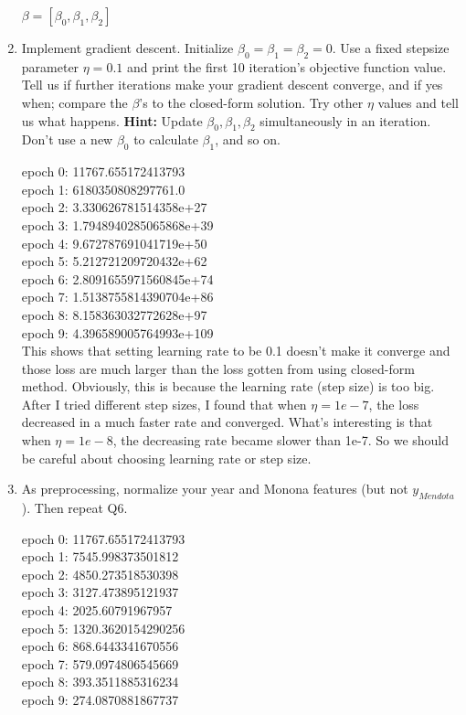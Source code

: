 \documentclass[a4paper]{article}
\theoremstyle{definition}
\newenvironment{soln}{
    \leavevmode\color{blue}\ignorespaces
}{}
\begin{document}
\begin{enumerate}
\begin{soln}
$\beta = [\beta_0, \beta_1, \beta_2]$
\end{soln}

\item
Implement gradient descent.  Initialize $\beta_0= \beta_1= \beta_2=0$.  Use a fixed stepsize parameter $\eta=0.1$ and print the first 10 iteration's objective function value.
Tell us if further iterations make your gradient descent converge, and if yes when; compare the $\beta$'s to the closed-form solution.
Try other $\eta$ values and tell us what happens.
\textbf{Hint:} Update $\beta_0, \beta_1, \beta_2$ simultaneously in an iteration.  Don't use a new $\beta_0$ to calculate $\beta_1$, and so on.

\begin{soln}
epoch 0:  11767.655172413793\\
epoch 1:  6180350808297761.0\\
epoch 2:  3.330626781514358e+27\\
epoch 3:  1.7948940285065868e+39\\
epoch 4:  9.672787691041719e+50\\
epoch 5:  5.212721209720432e+62\\
epoch 6:  2.8091655971560845e+74\\
epoch 7:  1.5138755814390704e+86\\
epoch 8:  8.158363032772628e+97\\
epoch 9:  4.396589005764993e+109\\

This shows that setting learning rate to be 0.1 doesn't make it converge and those loss are much larger than the loss gotten from using closed-form method.
Obviously, this is because the learning rate (step size) is too big. After I tried different step sizes, I found that when $\eta = 1e-7$, the loss decreased in a much faster rate and converged. What's interesting is that when $\eta = 1e-8$, the decreasing rate became slower than 1e-7. So we should be careful about choosing learning rate or step size.

\end{soln}


\item
As preprocessing, normalize your year and Monona features (but not $y_{Mendota}$).
Then repeat Q6.

\begin{soln}
epoch 0:  11767.655172413793\\
epoch 1:  7545.998373501812\\
epoch 2:  4850.273518530398\\
epoch 3:  3127.473895121937\\
epoch 4:  2025.60791967957\\
epoch 5:  1320.3620154290256\\
epoch 6:  868.6443341670556\\
epoch 7:  579.0974806545669\\
epoch 8:  393.3511885316234\\
epoch 9:  274.0870881867737\\
\end{soln}


\end{enumerate}
\end{document}
